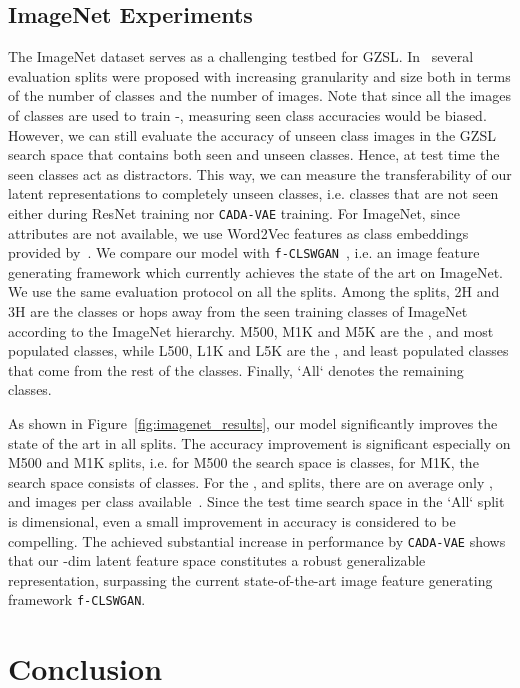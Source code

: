 \documentclass[10pt,twocolumn,letterpaper]{article}
\begin{document}
\subsection{ImageNet Experiments}

The ImageNet dataset serves as a challenging testbed for GZSL. In~\cite{goodbadugly} several evaluation splits were proposed with increasing granularity and size both in terms of the number of classes and the number of images. Note that since all the images of  classes are used to train -, measuring seen class accuracies would be biased. However, we can still evaluate the accuracy of unseen class images in the GZSL search space that contains both seen and unseen classes. Hence, at test time the  seen classes act as distractors. This way, we can measure the transferability of our latent representations to completely unseen classes, i.e. classes that are not seen either during ResNet training nor \texttt{CADA-VAE} training. For ImageNet, since attributes are not available, we use Word2Vec features as class embeddings provided by~\cite{sync}. 
We compare our model with \texttt{f-CLSWGAN}~\cite{featgen}, i.e. an image feature generating framework which currently achieves the state of the art on ImageNet. We use the same evaluation protocol on all the splits. Among the splits, 2H and 3H are the classes  or  hops away from the  seen training classes of ImageNet according to the ImageNet hierarchy. M500, M1K and M5K are the ,  and  most populated classes, while L500, L1K and L5K are the ,  and  least populated classes that come from the rest of the  classes. Finally, `All` denotes the remaining  classes.

As shown in Figure~\ref{fig:imagenet_results}, our model significantly improves the state of the art in all splits. The accuracy improvement is significant especially on M500 and M1K splits, i.e. for M500 the search space is  classes, for M1K, the search space consists of  classes. For the ,  and  splits, there are on average only ,  and  images per class available~\cite{goodbadugly}. Since the test time search space in the `All` split is  dimensional, even a small improvement in accuracy is considered to be compelling. The achieved substantial increase in performance by \texttt{CADA-VAE} shows that our -dim latent feature space constitutes a robust generalizable representation, surpassing the current state-of-the-art image feature generating framework \texttt{f-CLSWGAN}.


\section{Conclusion}
\label{sec:con}
\end{document}
